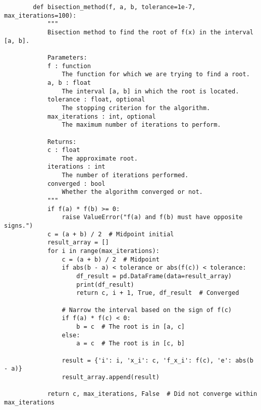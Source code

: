 \documentclass{article}
\begin{document}
    \begin{verbatim}
        def bisection_method(f, a, b, tolerance=1e-7, max_iterations=100):
            """
            Bisection method to find the root of f(x) in the interval [a, b].

            Parameters:
            f : function
                The function for which we are trying to find a root.
            a, b : float
                The interval [a, b] in which the root is located.
            tolerance : float, optional
                The stopping criterion for the algorithm.
            max_iterations : int, optional
                The maximum number of iterations to perform.

            Returns:
            c : float
                The approximate root.
            iterations : int
                The number of iterations performed.
            converged : bool
                Whether the algorithm converged or not.
            """
            if f(a) * f(b) >= 0:
                raise ValueError("f(a) and f(b) must have opposite signs.")
            c = (a + b) / 2  # Midpoint initial
            result_array = []
            for i in range(max_iterations):
                c = (a + b) / 2  # Midpoint
                if abs(b - a) < tolerance or abs(f(c)) < tolerance:
                    df_result = pd.DataFrame(data=result_array)
                    print(df_result)
                    return c, i + 1, True, df_result  # Converged

                # Narrow the interval based on the sign of f(c)
                if f(a) * f(c) < 0:
                    b = c  # The root is in [a, c]
                else:
                    a = c  # The root is in [c, b]

                result = {'i': i, 'x_i': c, 'f_x_i': f(c), 'e': abs(b - a)}
                result_array.append(result)

            return c, max_iterations, False  # Did not converge within max_iterations

    \end{verbatim}
\end{document}
